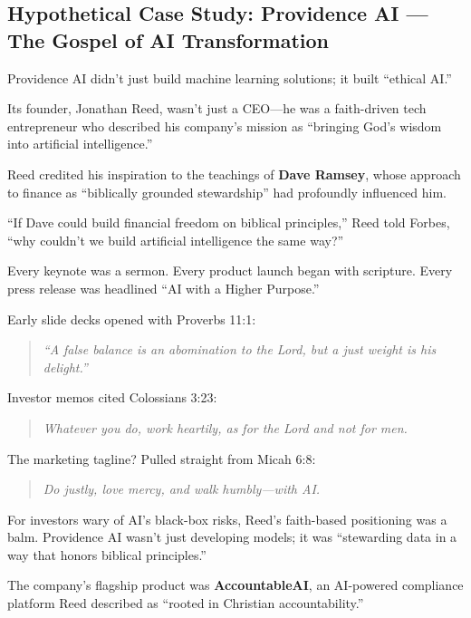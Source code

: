 \subsection{Hypothetical Case Study: Providence AI\texttrademark{} — The Gospel of AI Transformation}

Providence AI\texttrademark{} didn’t just build machine learning solutions; it built “ethical AI\texttrademark{}.”

Its founder, Jonathan Reed, wasn’t just a CEO—he was a faith-driven tech entrepreneur who described his company’s mission as “bringing God’s wisdom into artificial intelligence.”

Reed credited his inspiration to the teachings of \textbf{Dave Ramsey}, whose approach to finance as “biblically grounded stewardship” had profoundly influenced him.

“If Dave could build financial freedom on biblical principles,” Reed told Forbes,  
“why couldn’t we build artificial intelligence the same way?”

Every keynote was a sermon. Every product launch began with scripture. Every press release was headlined “AI\texttrademark{} with a Higher Purpose.”

Early slide decks opened with Proverbs 11:1:

\begin{quote}
\textit{“A false balance is an abomination to the Lord, but a just weight is his delight.”}
\end{quote}

Investor memos cited Colossians 3:23:

\begin{quote}
\textit{Whatever you do, work heartily, as for the Lord and not for men.}
\end{quote}

The marketing tagline? Pulled straight from Micah 6:8:

\begin{quote}
\textit{Do justly, love mercy, and walk humbly—with AI\texttrademark{}.}
\end{quote}

For investors wary of AI’s black-box risks, Reed’s faith-based positioning was a balm. Providence AI\texttrademark{} wasn’t just developing models; it was “stewarding data in a way that honors biblical principles.”

\medskip

The company’s flagship product was \textbf{AccountableAI\texttrademark{}}, an AI-powered compliance platform Reed described as “rooted in Christian accountability.”

